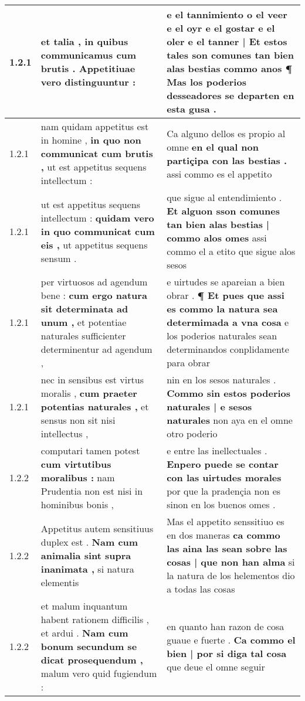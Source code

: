 \begin{tabular}{|p{1cm}|p{6.5cm}|p{6.5cm}|}
1.2.1 & et talia , \textbf{ in quibus communicamus cum brutis . } Appetitiuae vero distinguuntur : & e el tannimiento o el veer \textbf{ e el oyr e el gostar e el oler e el tanner | Et estos tales son comunes tan bien alas bestias commo anos ¶ } Mas los poderios desseadores se departen en esta gusa . \\\hline
1.2.1 & nam quidam appetitus est in homine , \textbf{ in quo non communicat cum brutis , } ut est appetitus sequens intellectum : & Ca alguno dellos es propio al omne \textbf{ en el qual non partiçipa con las bestias . } assi commo es el appetito \\\hline
1.2.1 & ut est appetitus sequens intellectum : \textbf{ quidam vero in quo communicat cum eis , } ut appetitus sequens sensum . & que sigue al entendimiento . \textbf{ Et alguon sson comunes tan bien alas bestias | commo alos omes } assi commo el a etito que sigue alos sesos \\\hline
1.2.1 & per virtuosos ad agendum bene : \textbf{ cum ergo natura sit determinata ad unum , } et potentiae naturales sufficienter determinentur ad agendum , & e uirtudes se apareian a bien obrar . \textbf{ ¶ Et pues que assi es commo la natura sea determimada a vna cosa } e los poderios naturales sean determinandos conplidamente para obrar \\\hline
1.2.1 & nec in sensibus est virtus moralis , \textbf{ cum praeter potentias naturales , } et sensus non sit nisi intellectus , & nin en los sesos naturales . \textbf{ Commo sin estos poderios naturales | e sesos naturales } non aya en el omne otro poderio \\\hline
1.2.2 & computari tamen potest \textbf{ cum virtutibus moralibus : } nam Prudentia non est nisi in hominibus bonis , & e entre las inellectuales . \textbf{ Enpero puede se contar con las uirtudes morales } por que la pradençia non es sinon en los buenos omes . \\\hline
1.2.2 & Appetitus autem sensitiuus duplex est . \textbf{ Nam cum animalia sint supra inanimata , } si natura elementis & Mas el appetito senssitiuo es en dos maneras \textbf{ ca commo las aina las sean sobre las cosas | que non han alma } si la natura de los helementos dio a todas las cosas \\\hline
1.2.2 & et malum inquantum habent rationem difficilis , et ardui . \textbf{ Nam cum bonum secundum se dicat prosequendum , } malum vero quid fugiendum : & en quanto han razon de cosa guaue e fuerte . \textbf{ Ca commo el bien | por si diga tal cosa } que deue el omne seguir \\\hline

\end{tabular}
